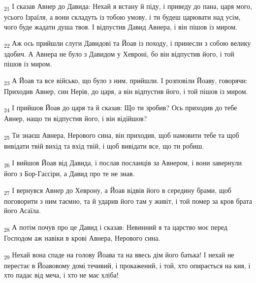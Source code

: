 \begin{tcolorbox}
\textsubscript{21} І сказав Авнер до Давида: Нехай я встану й піду, і приведу до пана, царя мого, усього Ізраїля, а вони складуть із тобою умову, і ти будеш царювати над усім, чого буде жадати душа твоя. І відпустив Давид Авнера, і він пішов із миром.
\end{tcolorbox}
\begin{tcolorbox}
\textsubscript{22} Аж ось прийшли слуги Давидові та Йоав із походу, і принесли з собою велику здобич. А Авнера не було з Давидом у Хевроні, бо він відпустив його, і той пішов із миром.
\end{tcolorbox}
\begin{tcolorbox}
\textsubscript{23} А Йоав та все військо, що було з ним, прийшли. І розповіли Йоаву, говорячи: Приходив Авнер, син Нерів, до царя, а він відпустив його, і той пішов із миром.
\end{tcolorbox}
\begin{tcolorbox}
\textsubscript{24} І прийшов Йоав до царя та й сказав: Що ти зробив? Ось приходив до тебе Авнер, нащо ти відпустив його, і він відійшов?
\end{tcolorbox}
\begin{tcolorbox}
\textsubscript{25} Ти знаєш Авнера, Нерового сина, він приходив, щоб намовити тебе та щоб вивідати твій вихід та вхід твій, і щоб вивідати все, що ти робиш.
\end{tcolorbox}
\begin{tcolorbox}
\textsubscript{26} І вийшов Йоав від Давида, і послав посланців за Авнером, і вони завернули його з Бор-Гассіри, а Давид про те не знав.
\end{tcolorbox}
\begin{tcolorbox}
\textsubscript{27} І вернувся Авнер до Хеврону, а Йоав відвів його в середину брами, щоб поговорити з ним таємно, та й ударив його там у живіт, і той помер за кров брата його Асаїла.
\end{tcolorbox}
\begin{tcolorbox}
\textsubscript{28} А потім почув про це Давид і сказав: Невинний я та царство моє перед Господом аж навіки в крові Авнера, Нерового сина.
\end{tcolorbox}
\begin{tcolorbox}
\textsubscript{29} Нехай вона спаде на голову Йоава та на ввесь дім його батька! І нехай не перестає в Йоавовому домі течивий, і прокажений, і той, хто опирається на кия, і хто падає від меча, і хто не має хліба!
\end{tcolorbox}
